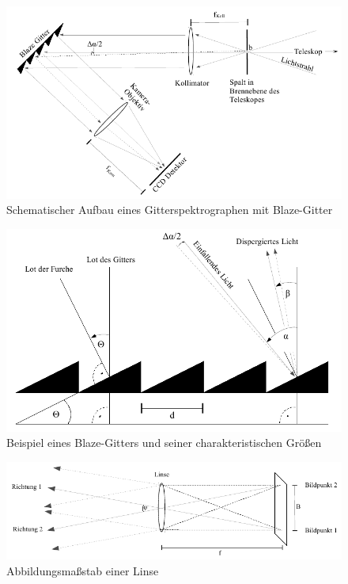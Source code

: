 \begin{figure}
		\includegraphics[width=.9\textwidth]{images/Abbildung101}
\caption{ Schematischer Aufbau eines Gitterspektrographen mit Blaze-Gitter }
\label{fig:101}
\end{figure}

\begin{figure}
        \includegraphics[width=.9\textwidth]{images/Abbildung102.png}
\caption{ Beispiel eines Blaze-Gitters und seiner charakteristischen Größen }
\label{fig:102}
\end{figure}

\begin{figure}
        \includegraphics[width=.9\textwidth]{images/Abbildung103.png}
\caption{ Abbildungsmaßstab einer Linse }
\label{fig:103}
\end{figure}


